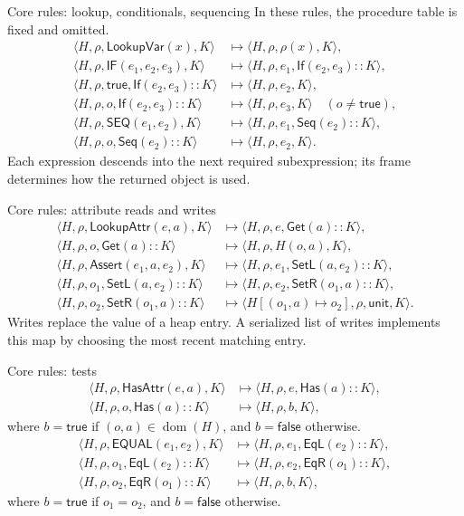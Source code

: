 \documentclass[11pt,aspectratio=169]{beamer}
\newcommand{\unit}{\mathsf{unit}}
\newcommand{\true}{\mathsf{true}}
\newcommand{\false}{\mathsf{false}}
\newcommand{\op}[1]{\mathsf{#1}}
\newcommand{\cfg}[4]{\langle #1,#2,#3,#4\rangle}
\begin{document}
\begin{frame}{Core rules: lookup, conditionals, sequencing}
\small
In these rules, the procedure table is fixed and omitted.
\[
\begin{aligned}
 \cfg{H}{\rho}{\op{LookupVar}(x)}{K}
  &\longmapsto\cfg{H}{\rho}{\rho(x)}{K},\\[3pt]
 \cfg{H}{\rho}{\op{IF}(e_1,e_2,e_3)}{K}
  &\longmapsto\cfg{H}{\rho}{e_1}{\op{If}(e_2,e_3)::K},\\
 \cfg{H}{\rho}{\true}{\op{If}(e_2,e_3)::K}
  &\longmapsto\cfg{H}{\rho}{e_2}{K},\\
 \cfg{H}{\rho}{o}{\op{If}(e_2,e_3)::K}
  &\longmapsto\cfg{H}{\rho}{e_3}{K}\quad(o\ne\true),\\[3pt]
 \cfg{H}{\rho}{\op{SEQ}(e_1,e_2)}{K}
  &\longmapsto\cfg{H}{\rho}{e_1}{\op{Seq}(e_2)::K},\\
 \cfg{H}{\rho}{o}{\op{Seq}(e_2)::K}
  &\longmapsto\cfg{H}{\rho}{e_2}{K}.
\end{aligned}
\]
Each expression descends into the next required subexpression;
its frame determines how the returned object is used.
\end{frame}

\begin{frame}{Core rules: attribute reads and writes}
\small
\[
\begin{aligned}
 \cfg{H}{\rho}{\op{LookupAttr}(e,a)}{K}
  &\longmapsto\cfg{H}{\rho}{e}{\op{Get}(a)::K},\\
 \cfg{H}{\rho}{o}{\op{Get}(a)::K}
  &\longmapsto\cfg{H}{\rho}{H(o,a)}{K},\\[3pt]
 \cfg{H}{\rho}{\op{Assert}(e_1,a,e_2)}{K}
  &\longmapsto\cfg{H}{\rho}{e_1}{\op{SetL}(a,e_2)::K},\\
 \cfg{H}{\rho}{o_1}{\op{SetL}(a,e_2)::K}
  &\longmapsto\cfg{H}{\rho}{e_2}{\op{SetR}(o_1,a)::K},\\
 \cfg{H}{\rho}{o_2}{\op{SetR}(o_1,a)::K}
  &\longmapsto\cfg{H[(o_1,a)\mapsto o_2]}{\rho}{\unit}{K}.
\end{aligned}
\]
Writes replace the value of a heap entry. A serialized list of writes
implements this map by choosing the most recent matching entry.
\end{frame}

\begin{frame}{Core rules: tests}
\small
\[
\begin{aligned}
 \cfg{H}{\rho}{\op{HasAttr}(e,a)}{K}
  &\longmapsto\cfg{H}{\rho}{e}{\op{Has}(a)::K},\\
 \cfg{H}{\rho}{o}{\op{Has}(a)::K}
  &\longmapsto\cfg{H}{\rho}{b}{K},
\end{aligned}
\]
where $b=\true$ if $(o,a)\in\operatorname{dom}(H)$, and $b=\false$ otherwise.
\[
\begin{aligned}
 \cfg{H}{\rho}{\op{EQUAL}(e_1,e_2)}{K}
  &\longmapsto\cfg{H}{\rho}{e_1}{\op{EqL}(e_2)::K},\\
 \cfg{H}{\rho}{o_1}{\op{EqL}(e_2)::K}
  &\longmapsto\cfg{H}{\rho}{e_2}{\op{EqR}(o_1)::K},\\
 \cfg{H}{\rho}{o_2}{\op{EqR}(o_1)::K}
  &\longmapsto\cfg{H}{\rho}{b}{K},
\end{aligned}
\]
where $b=\true$ if $o_1=o_2$, and $b=\false$ otherwise.
\end{frame}
\end{document}
